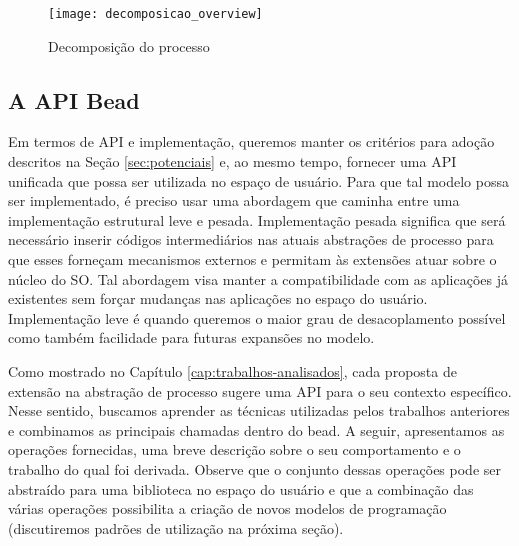 \begin{figure}[!h]
  \centering
  \texttt{[image: decomposicao\_overview]}
  \caption{Decomposição do processo}
  \label{fig:decomposicao_proc}
\end{figure}

\subsection{A API Bead}
\label{sec:api}

Em termos de API e implementação, queremos manter os critérios para adoção
descritos na Seção \ref{sec:potenciais} e, ao mesmo tempo, fornecer uma API
unificada que possa ser utilizada no espaço de usuário. Para que tal modelo
possa ser implementado, é preciso usar uma abordagem que caminha entre uma
implementação estrutural leve e pesada. Implementação pesada significa que será
necessário inserir códigos intermediários nas atuais abstrações de processo para
que esses forneçam mecanismos externos e permitam às extensões atuar sobre o
núcleo do SO. Tal abordagem visa manter a compatibilidade com as
aplicações já existentes sem forçar mudanças nas aplicações no espaço
do usuário. Implementação leve é quando queremos o maior grau de desacoplamento
possível como também facilidade para futuras expansões no modelo.

Como mostrado no Capítulo \ref{cap:trabalhos-analisados}, cada proposta de
extensão na abstração de processo sugere uma API para o seu contexto
específico. Nesse sentido, buscamos aprender as técnicas utilizadas pelos
trabalhos anteriores e combinamos as principais chamadas dentro do bead. A
seguir, apresentamos as operações fornecidas, uma breve descrição sobre o seu
comportamento e o trabalho do qual foi derivada. Observe que o conjunto dessas
operações pode ser abstraído para uma biblioteca no espaço do usuário e que a
combinação das várias operações possibilita a criação de novos modelos de
programação (discutiremos padrões de utilização na próxima seção). 

